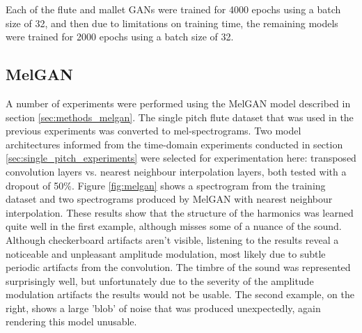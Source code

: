 Each of the flute and mallet GANs were trained for 4000 epochs using a batch size of 32, and then due to limitations on training time, the remaining models were trained for 2000 epochs using a batch size of 32.

\subsection{MelGAN}
A number of experiments were performed using the MelGAN model described in section \ref{sec:methods_melgan}. The single pitch flute dataset that was used in the previous experiments was converted to mel-spectrograms. Two model architectures informed from the time-domain experiments conducted in section \ref{sec:single_pitch_experiments} were selected for experimentation here: transposed convolution layers vs. nearest neighbour interpolation layers, both tested with a dropout of 50\%. Figure \ref{fig:melgan} shows a spectrogram from the training dataset and two spectrograms produced by MelGAN with nearest neighbour interpolation. These results show that the structure of the harmonics was learned quite well in the first example, although misses some of a nuance of the sound. Although checkerboard artifacts aren't visible, listening to the results reveal a noticeable and unpleasant amplitude modulation, most likely due to subtle periodic artifacts from the convolution. The timbre of the sound was represented surprisingly well, but unfortunately due to the severity of the amplitude modulation artifacts the results would not be usable. The second example, on the right, shows a large 'blob' of noise that was produced unexpectedly, again rendering this model unusable.

